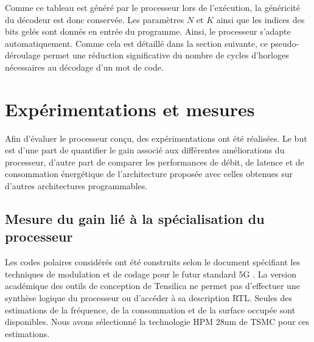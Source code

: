 Comme ce tableau est généré par le processeur lors de l'exécution, la généricité du décodeur est donc conservée. Les paramètres $N$ et $K$ ainsi que les indices des bits gelés sont donnés en entrée du programme. Ainsi, le processeur s'adapte automatiquement. Comme cela est détaillé dans la section suivante, ce pseudo-déroulage permet une réduction significative du nombre de cycles d'horloges nécessaires au décodage d'un mot de code.


\section{Expérimentations et mesures}
\label{sec:tensilica_res}
Afin d'évaluer le processeur conçu, des expérimentations ont été réalisées. Le but est d'une part de quantifier le gain associé aux différentes améliorations du processeur, d'autre part de comparer les performances de débit, de latence et de consommation énergétique de l'architecture proposée avec celles obtenues sur d'autres architectures programmables.
\subsection{Mesure du gain lié à la spécialisation du processeur}

Les codes polaires considérés ont été construits selon le document spécifiant les techniques de modulation et de codage pour le futur standard 5G \cite{3gpp_ts_2017}. 
La version académique des outils de conception de Tensilica ne permet pas d'effectuer une synthèse logique du processeur ou d'accéder à sa description RTL. Seules des estimations de la fréquence, de la consommation et de la surface occupée sont disponibles. Nous avons sélectionné la technologie HPM 28nm de TSMC pour ces estimations.

